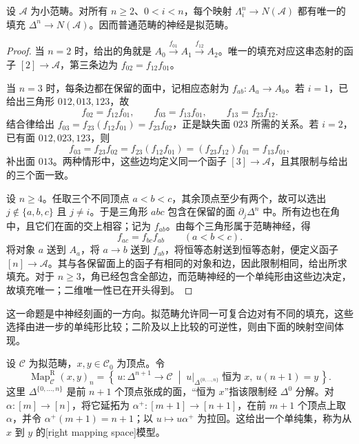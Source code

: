 \begin{proposition}\label{b4:prop:F-nerve-inner-horns}
	设 \(\mathcal A\) 为小范畴。对所有 \(n\ge2\)、\(0<i<n\)，每个映射 \(\Lambda_i^n\rightarrow N(\mathcal A)\) 都有唯一的填充 \(\Delta^n\rightarrow N(\mathcal A)\)。因而普通范畴的神经是拟范畴。
\end{proposition}
\begin{proof}
	当 \(n=2\) 时，给出的角就是 \(A_0\xrightarrow{f_{01}}A_1\xrightarrow{f_{12}}A_2\)。唯一的填充对应这串态射的函子 \([2]\rightarrow\mathcal A\)，第三条边为 \(f_{02}=f_{12}f_{01}\)。

	当 \(n=3\) 时，每条边都在保留的面中，记相应态射为 \(f_{ab}:A_a\rightarrow A_b\)。若 \(i=1\)，已给出三角形 \(012,013,123\)，故
	\[
		f_{02}=f_{12}f_{01},\qquad f_{03}=f_{13}f_{01},\qquad f_{13}=f_{23}f_{12}.
	\]
	结合律给出 \(f_{03}=f_{23}(f_{12}f_{01})=f_{23}f_{02}\)，正是缺失面 \(023\) 所需的关系。若 \(i=2\)，已有面 \(012,023,123\)，则
	\[
		f_{03}=f_{23}f_{02} =f_{23}(f_{12}f_{01}) =(f_{23}f_{12})f_{01}=f_{13}f_{01},
	\]
	补出面 \(013\)。两种情形中，这些边均定义同一个函子 \([3]\rightarrow\mathcal A\)，且其限制与给出的三个面一致。

	设 \(n\ge4\)。任取三个不同顶点 \(a<b<c\)，其余顶点至少有两个，故可以选出 \(j\notin\{a,b,c\}\) 且 \(j\ne i\)。于是三角形 \(abc\) 包含在保留的面 \(\partial_j\Delta^n\) 中。所有边也在角中，且它们在面的交上相容；记为 \(f_{ab}\)。由每个三角形属于范畴神经，得
	\[
		f_{ac}=f_{bc}f_{ab}\qquad(a<b<c).
	\]
	将对象 \(a\) 送到 \(A_a\)，将 \(a\rightarrow b\) 送到 \(f_{ab}\)，将恒等态射送到恒等态射，便定义函子 \([n]\rightarrow\mathcal A\)。其与各保留面上的函子有相同的对象和边，因此限制相同，给出所求填充。对于 \(n\ge3\)，角已经包含全部边，而范畴神经的一个单纯形由这些边决定，故填充唯一；二维唯一性已在开头得到。
\end{proof}

这一命题是\cite[Proposition 1.1.2.2]{Lurie2009HigherToposTheory}中神经刻画的一方向。拟范畴允许同一可复合边对有不同的填充，这些选择由进一步的单纯形比较；二阶及以上比较的可逆性，则由下面的映射空间体现。

\begin{definition}\label{b4:def:F-right-mapping-space}
	设 \(\mathcal C\) 为拟范畴，\(x,y\in\mathcal C_0\) 为顶点。令
	\[
		\operatorname{Map}_{\mathcal C}^{\mathrm R}(x,y)_n =\left\{\,u:\Delta^{n+1}\rightarrow\mathcal C \;\middle|\; u|_{\Delta^{\{0,\ldots,n\}}}\;\text{恒为}\;x, \ u(n+1)=y\,\right\}.
	\]
	这里 \(\Delta^{\{0,\ldots,n\}}\) 是前 \(n+1\) 个顶点张成的面，“恒为 \(x\)”指该限制经 \(\Delta^0\) 分解。对 \(\alpha:[m]\rightarrow[n]\)，将它延拓为 \(\alpha^+:[m+1]\rightarrow[n+1]\)，在前 \(m+1\) 个顶点上取 \(\alpha\)，并令 \(\alpha^+(m+1)=n+1\)；以 \(u\mapsto u\alpha^+\) 为拉回。这给出一个单纯集，称为从 \(x\) 到 \(y\) 的[right mapping space]模型。
\end{definition}

